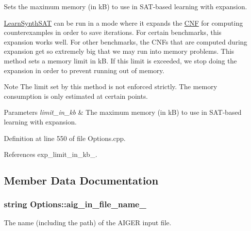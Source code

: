 Sets the maximum memory (in k\-B) to use in S\-A\-T-\/based learning with expansion. 

\hyperlink{classLearnSynthSAT}{Learn\-Synth\-S\-A\-T} can be run in a mode where it expands the \hyperlink{classCNF}{C\-N\-F} for computing counterexamples in order to save iterations. For certain benchmarks, this expansion works well. For other benchmarks, the C\-N\-Fs that are computed during expansion get so extremely big that we may run into memory problems. This method sets a memory limit in k\-B. If this limit is exceeded, we stop doing the expansion in order to prevent running out of memory.

\begin{DoxyNote}{Note}
The limit set by this method is not enforced strictly. The memory consumption is only estimated at certain points.
\end{DoxyNote}

\begin{DoxyParams}{Parameters}
{\em limit\-\_\-in\-\_\-kb} & The maximum memory (in k\-B) to use in S\-A\-T-\/based learning with expansion. \\
\hline
\end{DoxyParams}


Definition at line 550 of file Options.\-cpp.



References exp\-\_\-limit\-\_\-in\-\_\-kb\-\_\-.



\subsection{Member Data Documentation}
\hypertarget{classOptions_a334d015adb6fd67b0b1ce3663cd8ce02}{
\subsubsection[{aig\-\_\-in\-\_\-file\-\_\-name\-\_\-}]{\setlength{\rightskip}{0pt plus 5cm}string Options\-::aig\-\_\-in\-\_\-file\-\_\-name\-\_\-\hspace{0.3cm}{\ttfamily [protected]}}}\label{classOptions_a334d015adb6fd67b0b1ce3663cd8ce02}


The name (including the path) of the A\-I\-G\-E\-R input file. 



